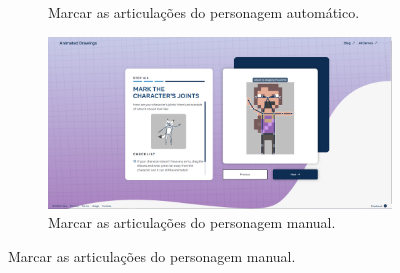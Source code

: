 \begin{figure}[htbp]
\begin{subfigure}{0.45\linewidth}
        \caption{\small Marcar as articulações do personagem automático.}
        \label{fig:sketch2f}
    \end{subfigure}
    \begin{subfigure}{0.45\linewidth}
        \centering
        \includegraphics[width=1\linewidth]{figs/sketchLab/2tela7.PNG}
        \caption{\small Marcar as articulações do personagem manual.}
        \label{fig:sketch2g}
    \end{subfigure}

\end{figure}

